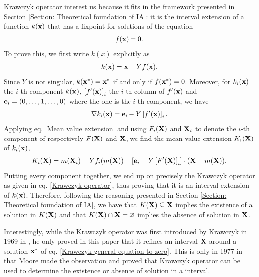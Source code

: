 \documentclass[
11pt, %
american, %
singlespacing, %
final, %
nolistspacing, %
liststotoc, %
headsepline, %
]{MastersDoctoralThesis} %
\begin{document}
Krawczyk operator interest us because it fits in the framework presented in Section \ref{Section: Theoretical foundation of IA}: it is the interval extension of a function $k(\boldsymbol{\mathrm{x}})$ that has a fixpoint for solutions of the equation
\begin{align}
	f(\boldsymbol{\mathrm{x}}) = 0. \label{Krawczyk general equation to zero}
\end{align}
To prove this, we first write $k(x)$ explicitly as
\begin{align}
	k(\boldsymbol{\mathrm{x}}) = \boldsymbol{\mathrm{x}} - Y f(\boldsymbol{\mathrm{x}}).
\end{align}
Since $Y$ is not singular, $k(\boldsymbol{\mathrm{x}}^*) = \boldsymbol{\mathrm{x}}^*$ if and only if $f(\boldsymbol{\mathrm{x}}^*) = 0$. Moreover, for $k_i(\boldsymbol{\mathrm{x}})$ the $i$-th component $k(\boldsymbol{\mathrm{x}})$, $\left[f'(\boldsymbol{\mathrm{x}})\right]_i$ the $i$-th column of $f'(\boldsymbol{\mathrm{x}})$ and $\boldsymbol{\mathrm{e}}_i = (0, \dots, 1, \dots, 0)$ where the one is the $i$-th component, we have
\begin{align}
	\nabla k_i(\boldsymbol{\mathrm{x}}) = \boldsymbol{\mathrm{e}}_i - Y \left[f'(\boldsymbol{\mathrm{x}})\right]_i.
\end{align}
Applying eq. \eqref{Mean value extension} and using $F_i(\boldsymbol{\mathrm{X}})$ and $\boldsymbol{\mathrm{X}}_i$ to denote the $i$-th component of respectively $F(\boldsymbol{\mathrm{X}})$ and $\boldsymbol{\mathrm{X}}$, we find the mean value extension $K_i(\boldsymbol{\mathrm{X}})$ of $k_i(\boldsymbol{\mathrm{x}})$,
\begin{align}
	K_i(\boldsymbol{\mathrm{X}}) = m(\boldsymbol{\mathrm{X}}_i) - Y f_i(m(\boldsymbol{\mathrm{X}})) - \left[\boldsymbol{\mathrm{e}}_i - Y \left[F'(\boldsymbol{\mathrm{X}})\right]_i\right] \cdot (\boldsymbol{\mathrm{X}} - m(\boldsymbol{\mathrm{X}})).
\end{align}
Putting every component together, we end up on precisely the Krawczyk operator as given in eq. \eqref{Krawczyk operator}, thus proving that it is an interval extension of $k(\boldsymbol{\mathrm{x}})$. Therefore, following the reasoning presented in Section \ref{Section: Theoretical foundation of IA}, we have that $K(\boldsymbol{\mathrm{X}}) \subseteq \boldsymbol{\mathrm{X}}$ implies the existence of a solution in $K(\boldsymbol{\mathrm{X}})$ and that $K(\boldsymbol{\mathrm{X}}) \cap \boldsymbol{\mathrm{X}} = \varnothing$ implies the absence of solution in $\boldsymbol{\mathrm{X}}$.

Interestingly, while the Krawczyk operator was first introduced by Krawczyk in 1969 in \cite{krawczyk1969newton}, he only proved in this paper that it refines an interval $\boldsymbol{\mathrm{X}}$ around a solution $\boldsymbol{\mathrm{x}}^*$ of eq. \eqref{Krawczyk general equation to zero}. This is only in 1977 in \cite{moore1977test} that Moore made the observation and proved that Krawczyk operator can be used to determine the existence or absence of solution in a interval.
\end{document}
